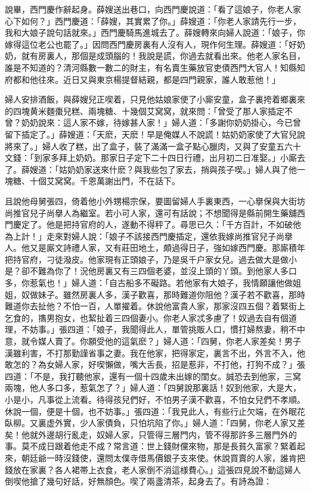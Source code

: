 說畢，西門慶作辭起身。薛嫂送出巷口，向西門慶說道：「看了這娘子，你老人家心下如何？」西門慶道：「薛嫂，其實累了你。」薛嫂道：「你老人家請先行一步，我和大娘子說句話就來。」西門慶騎馬進城去了。薛嫂轉來向婦人說道：「娘子，你嫁得這位老公也罷了。」因問西門慶房裏有人沒有人，現作何生理。薛嫂道：「好奶奶，就有房裏人，那個是成頭腦的！我說是謊，你過去就看出來。他老人家名目，誰是不知道的？清河縣數一數二的財主，有名賣生藥放官吏債西門大官人！知縣知府都和他往來。近日又與東京楊提督結親，都是四門親家，誰人敢惹他！」

婦人安排酒飯，與薛嫂兒正喫着，只見他姑娘家使了小廝安童，盒子裏挎着鄉裏來的四塊黄米麵棗兒糕、兩塊糖、十幾個艾窝窝，就來問：「曾受了那人家插定不曾？奶奶說來：這人家不嫁，待嫁甚人家！」婦人道：「多謝你奶奶掛心，今已曾留下插定了。」薛嫂道：「天麽，天麽！早是俺媒人不說謊！姑奶奶家使了大官兒說將來了。」婦人收了糕，出了盒子，裝了滿滿一盒子點心臘肉，又與了安童五六十文錢：「到家多拜上奶奶。那家日子定下二十四日行禮，出月初二日准娶。」小廝去了。薛嫂道：「姑奶奶家送來什麽？與我些包了家去，捎與孩子喫。」婦人與了他一塊糖、十個艾窝窝。千恩萬謝出門，不在話下。

且說他母舅張四，倚着他小外甥楊宗保，要圖留婦人手裏東西，一心擧保與大街坊尚推官兒子尚擧人為繼室。若小可人家，還可有話說；不想聞得是縣前開生藥舖西門慶定了。他是把持官府的人，遂動不得秤了。尋思已久：「千方百計，不如破他為上計！」走來對婦人說：「娘子不該接西門慶插定，還依我嫁尚推官兒子尚擧人。他又是廝文詩禮人家，又有莊田地土，頗過得日子，強如嫁西門慶。那廝積年把持官府，刁徒潑皮。他家現有正頭娘子，乃是吳千户家女兒。過去做大是做小是？卻不難為你了！況他房裏又有三四個老婆，並沒上頭的丫頭。到他家人多口多，你惹氣也！」婦人道：「自古船多不礙路。若他家有大娘子，我情願讓他做姐姐，奴做妹子。雖然房裏人多，漢子歡喜，那時難道你阻他？漢子若不歡喜，那時難道你去扯他？不怕一百，人單擢着。休說他富貴人家，那家沒四五個？着緊街上乞食的，㩦男抱女，也絜扯着三四個妻小。你老人家忒多慮了！奴過去自有個道理，不妨事。」張四道：「娘子，我聞得此人，單管挑販人口，慣打婦熬妻，稍不中意，就令媒人賣了。你願受他的這氣麽？」婦人道：「四舅，你老人家差矣！男子漢雖利害，不打那勤謹省事之妻。我在他家，把得家定，裏言不出，外言不入，他敢怎的？為女婦人家，好喫懶做，嘴大舌長，招是惹非，不打他，打狗不成？」張四道：「不是，我打聽他家，還有一個十四歲未出嫁的閨女。誠恐去到他家，三窝兩塊，他人多口多，惹氣怎了？」婦人道：「四舅說那裏話！奴到他家，大是大，小是小，凡事從上流看。待得孩兒們好，不怕男子漢不歡喜，不怕女兒們不孝順。休說一個，便是十個，也不妨事。」張四道：「我見此人，有些行止欠端，在外眠花臥柳。又裏虚外實，少人家債負，只怕坑陷了你。」婦人道：「四舅，你老人家又差矣！他就外邊胡行亂走，奴婦人家，只管得三層門内，管不得那許多三層門外的事。莫不成日跟着他走不成？常言道：世上錢財儻來物，那是長貧久富家？緊着起來，朝廷爺一時沒錢使，還問太僕寺借馬價銀子支來使。休說買賣的人家，誰肯把錢放在家裏？各人裙帯上衣食，老人家倒不消這様費心。」這張四見說不動這婦人倒喫他搶了幾句好話，好無顏色。喫了兩盞清茶，起身去了。有詩為證：

